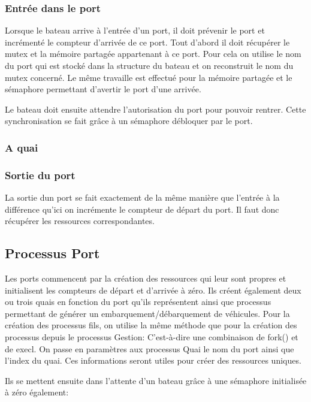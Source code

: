 \documentclass[a4paper, 11pt]{article}
\begin{document}
		\subsubsection{Entrée dans le port}
			
			Lorsque le bateau arrive à l'entrée d'un port, il doit prévenir le port et incrémenté le compteur d'arrivée de ce port. Tout d'abord il doit récupérer le mutex et la mémoire partagée appartenant à ce port. Pour cela on utilise le nom du port qui est stocké dans la structure du bateau et on reconstruit le nom du mutex concerné. Le même travaille est effectué pour la mémoire partagée et le sémaphore permettant d'avertir le port d'une arrivée.	
			
			Le bateau doit ensuite attendre l'autorisation du port pour pouvoir rentrer. Cette synchronisation se fait grâce à un sémaphore débloquer par le port.
		
		\subsubsection{A quai}
		
		\subsubsection{Sortie du port}
			
			La sortie dun port se fait exactement de la même manière que l'entrée à la différence qu'ici on incrémente le compteur de départ du port. Il faut donc récupérer les ressources correspondantes.
	\subsection{Processus Port}
		Les ports commencent par la création des ressources qui leur sont propres et initialisent les compteurs de départ et d'arrivée à zéro. Ils créent également deux ou trois quais en fonction du port qu'ils représentent ainsi que processus permettant de générer un embarquement/débarquement de véhicules. Pour la création des processus fils, on utilise la même méthode que pour la création des processus depuis le processus Gestion: C'est-à-dire une combinaison de fork() et de execl. On passe en paramètres aux processus Quai le nom du port ainsi que l'index du quai. Ces informations seront utiles pour créer des ressources uniques.
		
		Ils se mettent ensuite dans l'attente d'un bateau grâce à une sémaphore initialisée à zéro également: 
		
		
\end{document}
